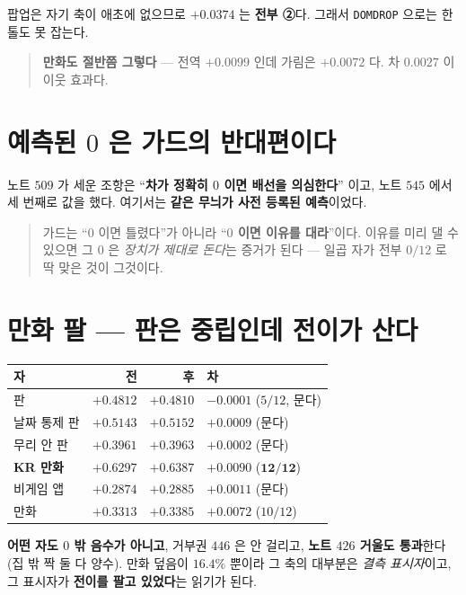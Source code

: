 \documentclass[11pt]{article}
\begin{document}
팝업은 자기 축이 애초에 없으므로 $+0.0374$ 는 \textbf{전부 ②}다. 그래서
\texttt{DOMDROP} 으로는 한 톨도 못 잡는다.

\begin{quote}
\textbf{만화도 절반쯤 그렇다} --- 전역 $+0.0099$ 인데 가림은 $+0.0072$ 다.
차 $0.0027$ 이 이웃 효과다.
\end{quote}

\section{예측된 $0$ 은 가드의 반대편이다}

노트 $509$ 가 세운 조항은 ``\textbf{차가 정확히 $0$ 이면 배선을 의심한다}''
이고, 노트 $545$ 에서 세 번째로 값을 했다. 여기서는 \textbf{같은 무늬가
사전 등록된 예측}이었다.

\begin{quote}
가드는 ``$0$ 이면 틀렸다''가 아니라 ``\textbf{$0$ 이면 이유를 대라}''이다.
이유를 미리 댈 수 있으면 그 $0$ 은 \emph{장치가 제대로 돈다}는 증거가
된다 --- 일곱 자가 전부 $0/12$ 로 딱 맞은 것이 그것이다.
\end{quote}

\section{만화 팔 --- 판은 중립인데 전이가 산다}

\begin{center}
\begin{tabular}{lrrl}
\hline
자 & 전 & 후 & 차 \\
\hline
판 & $+0.4812$ & $+0.4810$ & $-0.0001$ ($5/12$, 문다) \\
날짜 통제 판 & $+0.5143$ & $+0.5152$ & $+0.0009$ (문다) \\
무리 안 판 & $+0.3961$ & $+0.3963$ & $+0.0002$ (문다) \\
\textbf{KR 만화} & $+0.6297$ & $+0.6387$ & $\mathbf{+0.0090}$ ($\mathbf{12/12}$) \\
비게임 앱 & $+0.2874$ & $+0.2885$ & $+0.0011$ (문다) \\
\hline
만화 & $+0.3313$ & $+0.3385$ & $+0.0072$ ($10/12$) \\
\hline
\end{tabular}
\end{center}

\textbf{어떤 자도 $0$ 밖 음수가 아니고}, 거부권 $446$ 은 안 걸리고,
\textbf{노트 $426$ 거울도 통과}한다(집 밖 짝 둘 다 양수). 만화 덮음이
$16.4\%$ 뿐이라 그 축의 대부분은 \emph{결측 표시자}이고, 그 표시자가
\textbf{전이를 팔고 있었다}는 읽기가 된다.
\end{document}
